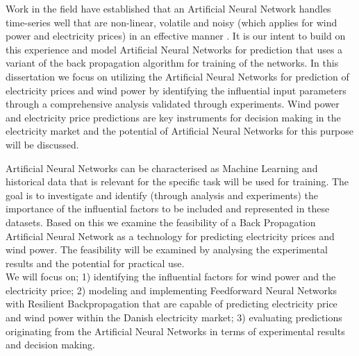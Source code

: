 Work in the field have established that an Artificial Neural Network handles time-series well that are non-linear, volatile and noisy (which applies for wind power and electricity prices) in an effective manner \cite{stockForecasting,pjmForecast,yamin2004adaptive,windForecastPortugal}. It is our intent to build on this experience and model Artificial Neural Networks for prediction that uses a variant of the back propagation algorithm for training of the networks. In this dissertation we focus on utilizing the Artificial Neural Networks for prediction of electricity prices and wind power by identifying the influential input parameters through a comprehensive analysis validated through experiments. Wind power and electricity price predictions are key instruments for decision making in the electricity market\cite{dayAheadImpactOfWindPowerForecasts,21} and the potential of Artificial Neural Networks for this purpose will be discussed.

Artificial Neural Networks can be characterised as Machine Learning\cite{18} and historical data that is relevant for the specific task will be used for training. The goal is to investigate and identify (through analysis and experiments) the importance of the influential factors to be included and represented in these datasets. Based on this we examine the feasibility of a Back Propagation Artificial Neural Network as a technology for predicting electricity prices and wind power. The feasibility will be examined by analysing the experimental results and the potential for practical use.
\\[0.5cm]
We will focus on; 1) identifying the influential factors for wind power and the electricity price; 2) modeling and implementing Feedforward Neural Networks with Resilient Backpropagation that are capable of predicting electricity price and wind power within the Danish electricity market; 3) evaluating predictions originating from the Artificial Neural Networks in terms of experimental results and decision making.